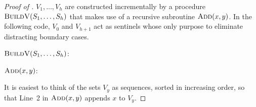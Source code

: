 \documentclass[kpfonts]{patmorin}
\newcommand{\snote}[1]{\fcolorbox{red}{yellow}{#1}}
\newcommand{\pnote}[1]{\ \newline\noindent\fcolorbox{red}{yellow}{\begin{minipage}{\textwidth}#1\end{minipage}}}
\let\ge\geqslant
\begin{document}
\begin{proof}[Proof of ]
  $V_1,\dots,V_{h}$ are constructed incrementally by a procedure $\textsc{BuildV}(S_1,\dots,S_h)$ that makes use of a recursive subroutine $\textsc{Add}(x, y)$.  In the following code, $V_0$ and $V_{h+1}$ act as sentinels whose only purpose to eliminate distracting boundary cases.

  \noindent$\textsc{BuildV}(S_1,\dots,S_h)$:
  \begin{algorithmic}[1]
        \ENDIF
      \ENDFOR
    \ENDFOR
  \end{algorithmic}

  \noindent$\textsc{Add}(x, y)$:
  \begin{algorithmic}[1]
      \IF{$|V_y|\ge 4$}
        \ENDIF
      \ENDIF
    \ENDIF
  \end{algorithmic}

  It is easiest to think of the sets $V_y$ as sequences, sorted in increasing order, so that Line~2 in $\textsc{Add}(x,y)$ appends $x$ to $V_y$.


\end{proof}
\end{document}
